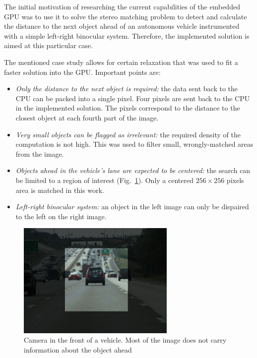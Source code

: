 \documentclass[conference]{IEEEtran}
\begin{document}
The initial motivation of researching the current capabilities of the embedded GPU was to use it to solve the stereo matching problem to detect and calculate the distance to the next object ahead of an autonomous vehicle instrumented with a simple left-right binocular system. Therefore, the implemented solution is aimed at this particular case.

The mentioned case study allows for certain relaxation that was used to fit a faster solution into the GPU. Important points are:

\begin{itemize}
 \item \emph{Only the distance to the next object is required:} the data sent back to the CPU can be packed into a single pixel. Four pixels are sent back to the CPU in the implemented solution. The pixels correspond to the distance to the closest object at each fourth part of the image.
 \item \emph{Very small objects can be flagged as irrelevant:} the required density of the computation is not high. This was used to filter small, wrongly-matched areas from the image.
 \item \emph{Objects ahead in the vehicle's lane are expected to be centered:} the search can be limited to a region of interest (Fig.~\ref{fig:highway_camera}). Only a centered $256\times256$ pixels area is matched in this work.
 \item \emph{Left-right binocular system:} an object in the left image can only be dispaired to the left on the right image.
\end{itemize}

\begin{figure}[!t]
 \centering
 \includegraphics[width=3.0in]{highway_camera}
 \caption{Camera in the front of a vehicle. Most of the image does not carry information about the object ahead}
 \label{fig:highway_camera}
\end{figure}
\end{document}
